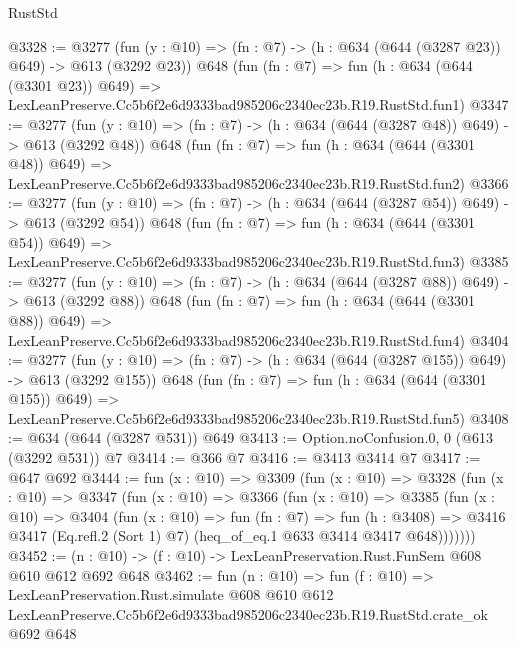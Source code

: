 \begin{lexlean}{RustStd}
\begin{coremodule}
@3328 := @3277
    (fun (y : @10) => (fn : @7) -> (h : @634 (@644 (@3287 @23)) @649) -> @613 (@3292 @23))
    @648
    (fun (fn : @7) =>
    fun (h : @634 (@644 (@3301 @23)) @649) =>
    LexLeanPreserve.Cc5b6f2e6d9333bad985206c2340ec23b.R19.RustStd.fun1)
@3347 := @3277
    (fun (y : @10) => (fn : @7) -> (h : @634 (@644 (@3287 @48)) @649) -> @613 (@3292 @48))
    @648
    (fun (fn : @7) =>
    fun (h : @634 (@644 (@3301 @48)) @649) =>
    LexLeanPreserve.Cc5b6f2e6d9333bad985206c2340ec23b.R19.RustStd.fun2)
@3366 := @3277
    (fun (y : @10) => (fn : @7) -> (h : @634 (@644 (@3287 @54)) @649) -> @613 (@3292 @54))
    @648
    (fun (fn : @7) =>
    fun (h : @634 (@644 (@3301 @54)) @649) =>
    LexLeanPreserve.Cc5b6f2e6d9333bad985206c2340ec23b.R19.RustStd.fun3)
@3385 := @3277
    (fun (y : @10) => (fn : @7) -> (h : @634 (@644 (@3287 @88)) @649) -> @613 (@3292 @88))
    @648
    (fun (fn : @7) =>
    fun (h : @634 (@644 (@3301 @88)) @649) =>
    LexLeanPreserve.Cc5b6f2e6d9333bad985206c2340ec23b.R19.RustStd.fun4)
@3404 := @3277
    (fun (y : @10) => (fn : @7) -> (h : @634 (@644 (@3287 @155)) @649) -> @613 (@3292 @155))
    @648
    (fun (fn : @7) =>
    fun (h : @634 (@644 (@3301 @155)) @649) =>
    LexLeanPreserve.Cc5b6f2e6d9333bad985206c2340ec23b.R19.RustStd.fun5)
@3408 := @634 (@644 (@3287 @531)) @649
@3413 := Option.noConfusion.{0, 0} (@613 (@3292 @531)) @7
@3414 := @366 @7
@3416 := @3413 @3414 @7
@3417 := @647 @692
@3444 := fun (x : @10) =>
  @3309
    (fun (x : @10) =>
    @3328
      (fun (x : @10) =>
      @3347
        (fun (x : @10) =>
        @3366
          (fun (x : @10) =>
          @3385
            (fun (x : @10) =>
            @3404
              (fun (x : @10) =>
              fun (fn : @7) =>
              fun (h : @3408) =>
              @3416 @3417 (Eq.refl.{2} (Sort 1) @7) (heq_of_eq.{1} @633 @3414 @3417 @648)))))))
@3452 := (n : @10) -> (f : @10) -> LexLeanPreservation.Rust.FunSem @608 @610 @612 @692 @648
@3462 := fun (n : @10) =>
  fun (f : @10) =>
  LexLeanPreservation.Rust.simulate
    @608
    @610
    @612
    LexLeanPreserve.Cc5b6f2e6d9333bad985206c2340ec23b.R19.RustStd.crate_ok
    @692
    @648
\end{coremodule}
\end{lexlean}
